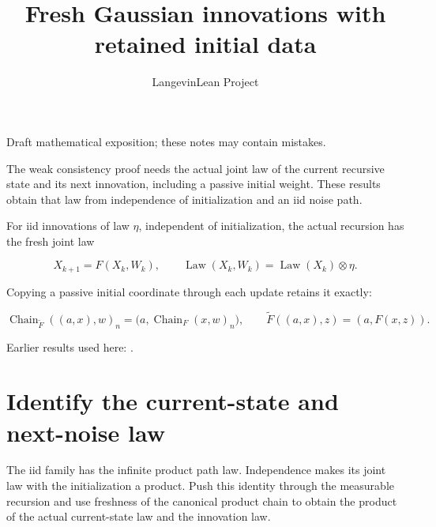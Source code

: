 \documentclass[11pt,a4paper]{article}
\title{\texorpdfstring{Fresh Gaussian innovations with retained initial data}{Fresh Gaussian innovations with retained initial data}}
\author{LangevinLean Project}
\date{}
\begin{document}
\maketitle
Draft mathematical exposition; these notes may contain mistakes.


The weak consistency proof needs the actual joint law of the current recursive state and its next innovation, including a passive initial weight. These results obtain that law from independence of initialization and an iid noise path.



For iid innovations of law \(\eta\), independent of initialization, the actual recursion has the fresh joint law


\[X_{k+1}=F(X_k,W_k),\qquad
\operatorname{Law}(X_k,W_k)=\operatorname{Law}(X_k)\otimes\eta.\]


Copying a passive initial coordinate through each update retains it exactly:


\[\operatorname{Chain}_{\widetilde F}((a,x),w)_n
=\bigl(a,\operatorname{Chain}_F(x,w)_n\bigr),\qquad
\widetilde F((a,x),z)=(a,F(x,z)).\]

Earlier results used here: \cite[Section~3.33]{LangevinLean2026ULASC}.

\section{\texorpdfstring{Identify the current-state and next-noise law}{Identify the current-state and next-noise law}}


The iid family has the infinite product path law. Independence makes its joint law with the initialization a product. Push this identity through the measurable recursion and use freshness of the canonical product chain to obtain the product of the actual current-state law and the innovation law.
\end{document}
